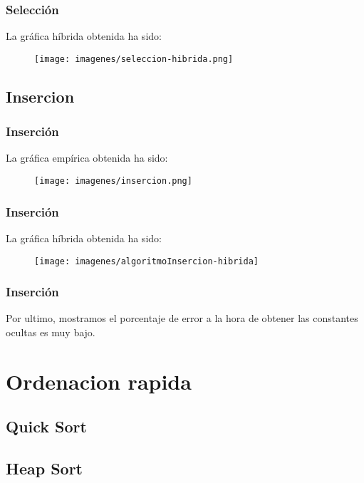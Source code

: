 \documentclass{beamer}
\begin{document}
\begin{frame}
	\frametitle{Selección}
	La gráfica híbrida obtenida ha sido:
	\begin{figure}
		\centering
		\texttt{[image: imagenes/seleccion-hibrida.png]}
		\caption{}
		\label{fig:E5}
	\end{figure}
	
\end{frame}
\subsection{Insercion}
\begin{frame}
	\frametitle{Inserción}
	La gráfica empírica obtenida ha sido:
	\begin{figure}
		\centering
		\texttt{[image: imagenes/insercion.png]}
		\caption{}
		\label{fig:E2}
	\end{figure}
	
\end{frame}

\begin{frame}
	\frametitle{Inserción}
	La gráfica híbrida obtenida ha sido:
	\begin{figure}
		\centering
		\texttt{[image: imagenes/algoritmoInsercion-hibrida]}
		\caption{}
		\label{fig:E3}
	\end{figure}
	
\end{frame}


\begin{frame}
	\frametitle{Inserción}
	Por ultimo, mostramos el porcentaje de error a la hora de obtener las constantes ocultas es muy bajo.
	
	
	
\end{frame}


\section{Ordenacion rapida} %

\subsection{Quick Sort}
\subsection{Heap Sort}
\end{document}
